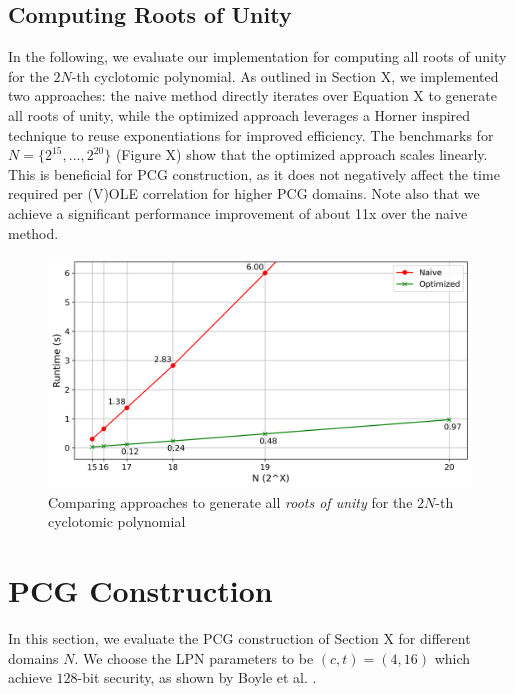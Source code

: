 \subsection{Computing Roots of Unity}
In the following, we evaluate our implementation for computing all roots of unity for the $2N$-th cyclotomic polynomial. As outlined in Section X, we implemented two approaches: the naive method directly iterates over Equation X to generate all roots of unity, while the optimized approach leverages a Horner inspired technique to reuse exponentiations for improved efficiency. The benchmarks for $N=\{2^{15}, ..., 2^{20}\}$ (Figure X) show that the optimized approach scales linearly. This is beneficial for PCG construction, as it does not negatively affect the time required per (V)OLE correlation for higher PCG domains. Note also that we achieve a significant performance improvement of about 11x over the naive method.

\begin{figure}[t]
    \centering
    \includegraphics[scale=0.49]{images/plots/gen_roots.png}
    \caption{Comparing approaches to generate all \textit{roots of unity} for the $2N$-th cyclotomic polynomial}
\end{figure}


\section{PCG Construction}
In this section, we evaluate the PCG construction of Section X for different domains $N$. We choose the LPN parameters to be $(c,t)=(4,16)$ which achieve $128$-bit security, as shown by Boyle et al. \cite{boyle2020efficient}. 

